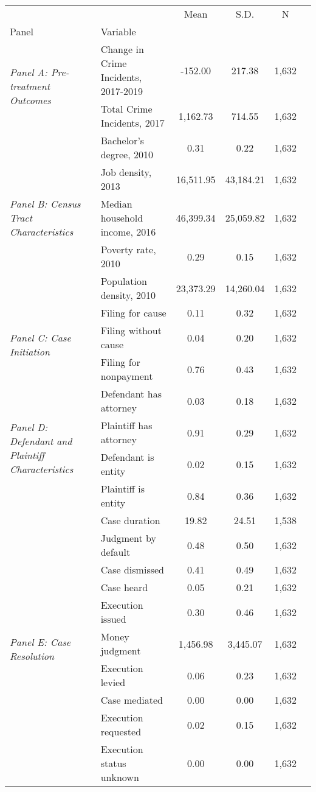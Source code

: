 \begin{tabular}{llcccc}
\toprule
 &  & Mean & S.D. & N \\
Panel & Variable &  &  &  \\
\midrule
\multirow[c]{2}{4cm}{\textit{Panel A: Pre-treatment Outcomes}} & Change in Crime Incidents, 2017-2019 & -152.00 & 217.38 & 1,632 \\
 & Total Crime Incidents, 2017 & 1,162.73 & 714.55 & 1,632 \\
\cline{1-5}
\multirow[c]{5}{4cm}{\textit{Panel B: Census Tract Characteristics}} & Bachelor's degree, 2010 & 0.31 & 0.22 & 1,632 \\
 & Job density, 2013 & 16,511.95 & 43,184.21 & 1,632 \\
 & Median household income, 2016 & 46,399.34 & 25,059.82 & 1,632 \\
 & Poverty rate, 2010 & 0.29 & 0.15 & 1,632 \\
 & Population density, 2010 & 23,373.29 & 14,260.04 & 1,632 \\
\cline{1-5}
\multirow[c]{3}{4cm}{\textit{Panel C: Case Initiation}} & Filing for cause & 0.11 & 0.32 & 1,632 \\
 & Filing without cause & 0.04 & 0.20 & 1,632 \\
 & Filing for nonpayment & 0.76 & 0.43 & 1,632 \\
\cline{1-5}
\multirow[c]{4}{4cm}{\textit{Panel D: Defendant and Plaintiff Characteristics}} & Defendant has attorney & 0.03 & 0.18 & 1,632 \\
 & Plaintiff has attorney & 0.91 & 0.29 & 1,632 \\
 & Defendant is entity & 0.02 & 0.15 & 1,632 \\
 & Plaintiff is entity & 0.84 & 0.36 & 1,632 \\
\cline{1-5}
\multirow[c]{10}{4cm}{\textit{Panel E: Case Resolution}} & Case duration & 19.82 & 24.51 & 1,538 \\
 & Judgment by default & 0.48 & 0.50 & 1,632 \\
 & Case dismissed & 0.41 & 0.49 & 1,632 \\
 & Case heard & 0.05 & 0.21 & 1,632 \\
 & Execution issued & 0.30 & 0.46 & 1,632 \\
 & Money judgment & 1,456.98 & 3,445.07 & 1,632 \\
 & Execution levied & 0.06 & 0.23 & 1,632 \\
 & Case mediated & 0.00 & 0.00 & 1,632 \\
 & Execution requested & 0.02 & 0.15 & 1,632 \\
 & Execution status unknown & 0.00 & 0.00 & 1,632 \\
\cline{1-5}
\bottomrule
\end{tabular}
